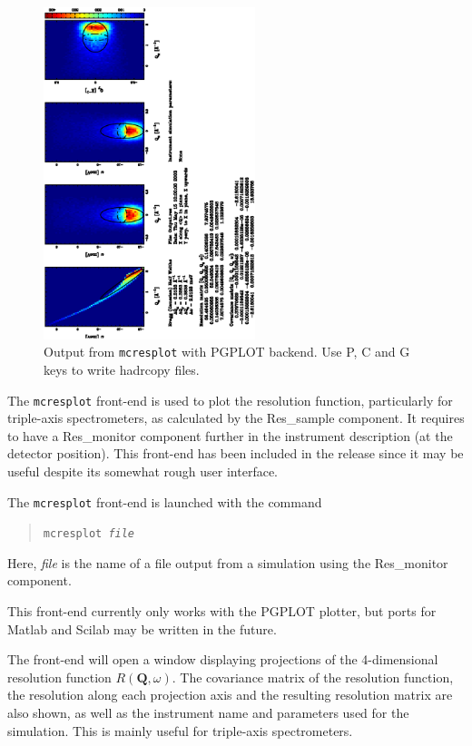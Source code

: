 \begin{figure}[htb!]
  \begin{center}
    \includegraphics[angle=-90,width=0.55\textwidth]{figures/mcresplot_PGPLOT.ps}
  \end{center}
\caption{Output from \texttt{mcresplot} with PGPLOT backend. 
  Use P, C and G keys to write hadrcopy files.}
\label{fig:mcresplot_PGPLOT}
\end{figure}

The \verb+mcresplot+ front-end is used to plot the resolution function, particularly for triple-axis 
spectrometers, as
calculated by the Res\_sample component. It requires to have a Res\_monitor component further in the instrument description (at the detector position).
This front-end 
has been included in the release since it may be useful
despite its somewhat rough user interface.

The \verb+mcresplot+ front-end is launched with the command
\begin{quote}
  \texttt{mcresplot {\it file\/}}
\end{quote}
Here, {\it file\/} is the name of a file output from a simulation using
the Res\_monitor component.

This front-end currently only works with the PGPLOT plotter, but ports for Matlab and Scilab may be written in the future.

The front-end will open a window displaying projections of the 4-dimensional
resolution function $R(\boldsymbol{Q}, \omega)$. The covariance matrix of the
resolution function, the resolution along each projection axis and the resulting
resolution matrix are also shown, as well as the instrument name and parameters
used for the simulation. This is mainly useful for triple-axis spectrometers.

